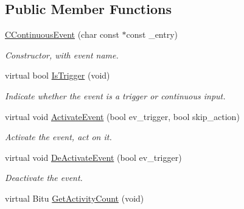 \subsection*{Public Member Functions}
\begin{DoxyCompactItemize}
\item 
\hypertarget{classCContinuousEvent_ac998a6e07ae19db1bd6000b26f3b2a56}{\hyperlink{classCContinuousEvent_ac998a6e07ae19db1bd6000b26f3b2a56}{C\-Continuous\-Event} (char const $\ast$const \-\_\-entry)}\label{classCContinuousEvent_ac998a6e07ae19db1bd6000b26f3b2a56}

\begin{DoxyCompactList}\small\item\em Constructor, with event name. \end{DoxyCompactList}\item 
\hypertarget{classCContinuousEvent_a7d1e187b39ea746e8aabf70d7c176d4f}{virtual bool \hyperlink{classCContinuousEvent_a7d1e187b39ea746e8aabf70d7c176d4f}{Is\-Trigger} (void)}\label{classCContinuousEvent_a7d1e187b39ea746e8aabf70d7c176d4f}

\begin{DoxyCompactList}\small\item\em Indicate whether the event is a trigger or continuous input. \end{DoxyCompactList}\item 
\hypertarget{classCContinuousEvent_ac092b5d5258a8d2566acd222086743fb}{virtual void \hyperlink{classCContinuousEvent_ac092b5d5258a8d2566acd222086743fb}{Activate\-Event} (bool ev\-\_\-trigger, bool skip\-\_\-action)}\label{classCContinuousEvent_ac092b5d5258a8d2566acd222086743fb}

\begin{DoxyCompactList}\small\item\em Activate the event, act on it. \end{DoxyCompactList}\item 
\hypertarget{classCContinuousEvent_a4cea918393a7d37b2cbe8491c46f880c}{virtual void \hyperlink{classCContinuousEvent_a4cea918393a7d37b2cbe8491c46f880c}{De\-Activate\-Event} (bool ev\-\_\-trigger)}\label{classCContinuousEvent_a4cea918393a7d37b2cbe8491c46f880c}

\begin{DoxyCompactList}\small\item\em Deactivate the event. \end{DoxyCompactList}\item 
\hypertarget{classCContinuousEvent_a3185a87873f79aea8c23054b55c1ceac}{virtual Bitu \hyperlink{classCContinuousEvent_a3185a87873f79aea8c23054b55c1ceac}{Get\-Activity\-Count} (void)}\label{classCContinuousEvent_a3185a87873f79aea8c23054b55c1ceac}


\end{DoxyCompactItemize}
